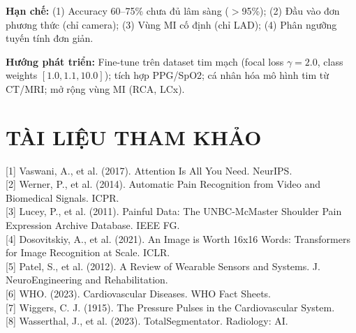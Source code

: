 \documentclass[journal]{IEEEtran}
\begin{document}
\textbf{Hạn chế:} (1) Accuracy 60--75\% chưa đủ lâm sàng ($>$95\%); (2) Đầu vào đơn phương thức (chỉ camera); (3) Vùng MI cố định (chỉ LAD); (4) Phân ngưỡng tuyến tính đơn giản.

\textbf{Hướng phát triển:} Fine-tune trên dataset tim mạch (focal loss $\gamma{=}2.0$, class weights $[1.0, 1.1, 10.0]$); tích hợp PPG/SpO2; cá nhân hóa mô hình tim từ CT/MRI; mở rộng vùng MI (RCA, LCx).

\section*{\centering TÀI LIỆU THAM KHẢO}

[1] Vaswani, A., et al. (2017). Attention Is All You Need. NeurIPS.\\

[2] Werner, P., et al. (2014). Automatic Pain Recognition from Video and Biomedical Signals. ICPR.\\

[3] Lucey, P., et al. (2011). Painful Data: The UNBC-McMaster Shoulder Pain Expression Archive Database. IEEE FG.\\

[4] Dosovitskiy, A., et al. (2021). An Image is Worth 16x16 Words: Transformers for Image Recognition at Scale. ICLR.\\

[5] Patel, S., et al. (2012). A Review of Wearable Sensors and Systems. J. NeuroEngineering and Rehabilitation.\\

[6] WHO. (2023). Cardiovascular Diseases. WHO Fact Sheets.\\

[7] Wiggers, C. J. (1915). The Pressure Pulses in the Cardiovascular System.\\

[8] Wasserthal, J., et al. (2023). TotalSegmentator. Radiology: AI.
\end{document}
